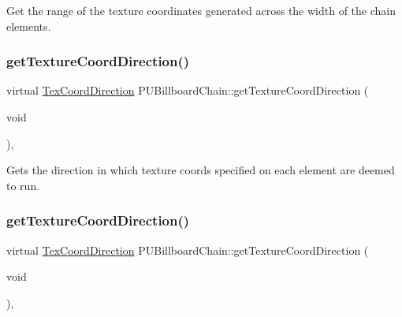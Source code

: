 Get the range of the texture coordinates generated across the width of the chain elements. \mbox{\label{classPUBillboardChain_ae122ca85af280539d493f39ea656a0b4}} 
\subsubsection{\texorpdfstring{get\+Texture\+Coord\+Direction()}{getTextureCoordDirection()}\hspace{0.1cm}{\footnotesize\ttfamily [1/2]}}
{\footnotesize\ttfamily virtual \hyperlink{classPUBillboardChain_a6ebaec09a615199356b9d50fdab2209f}{Tex\+Coord\+Direction} P\+U\+Billboard\+Chain\+::get\+Texture\+Coord\+Direction (\begin{DoxyParamCaption}\item[{void}]{ }\end{DoxyParamCaption})\hspace{0.3cm}{\ttfamily [inline]}, {\ttfamily [virtual]}}

Gets the direction in which texture coords specified on each element are deemed to run. \mbox{\label{classPUBillboardChain_ae122ca85af280539d493f39ea656a0b4}} 
\subsubsection{\texorpdfstring{get\+Texture\+Coord\+Direction()}{getTextureCoordDirection()}\hspace{0.1cm}{\footnotesize\ttfamily [2/2]}}
{\footnotesize\ttfamily virtual \hyperlink{classPUBillboardChain_a6ebaec09a615199356b9d50fdab2209f}{Tex\+Coord\+Direction} P\+U\+Billboard\+Chain\+::get\+Texture\+Coord\+Direction (\begin{DoxyParamCaption}\item[{void}]{ }\end{DoxyParamCaption})\hspace{0.3cm}{\ttfamily [inline]}, {\ttfamily [virtual]}}

